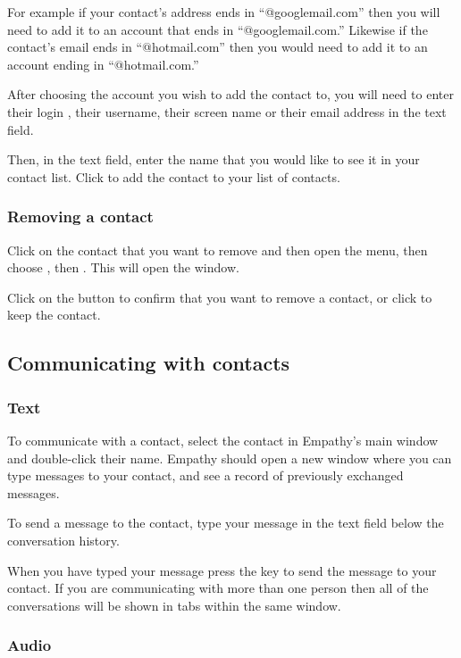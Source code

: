For example if your contact's address ends in ``@googlemail.com'' then you will 
need to add it to an account that ends in ``@googlemail.com.'' Likewise if the 
contact's email ends in ``@hotmail.com'' then you would need to add it to an 
account ending in ``@hotmail.com.''

After choosing the account you wish to add the contact to, you will
need to enter their login , their username, their screen name or their email
address in the  text field.

Then, in the  text field, enter the name that you would
like to see it in your contact list. Click  to add the contact to
your list of contacts.

\subsubsection{Removing a contact}

Click on the contact that you want to remove and then open the 
menu, then choose , then . This will
open the  window. 

Click on the  button to confirm that you want to remove a contact,
or click  to keep the contact.

\subsection{Communicating with contacts}

\subsubsection{Text}

To communicate with a contact, select the contact in Empathy's main window and
double-click their name. Empathy should open a new window where you can type
messages to your contact, and see a record of previously exchanged messages.

To send a message to the contact, type your message in the text field below
the conversation history. 

When you have typed your message press the  key to send the 
message to your contact. If you are communicating with more than one 
person then all of the conversations will be shown in tabs within the same window.

\subsubsection{Audio}

